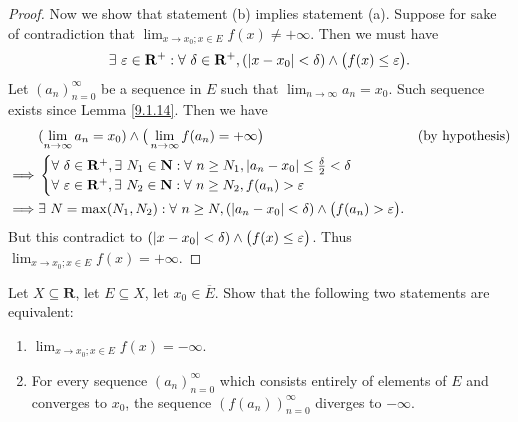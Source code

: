 \begin{proof}
    Now we show that statement (b) implies statement (a).
    Suppose for sake of contradiction that \(\lim_{x \to x_0 ; x \in E} f(x) \neq +\infty\).
    Then we must have
    \[
        \exists\ \varepsilon \in \mathbf{R}^+ : \forall\ \delta \in \mathbf{R}^+, (\abs*{x - x_0} < \delta) \land \big(f(x) \leq \varepsilon\big).
    \]
    Let \((a_n)_{n = 0}^\infty\) be a sequence in \(E\) such that \(\lim_{n \to \infty} a_n = x_0\).
    Such sequence exists since Lemma \ref{9.1.14}.
    Then we have
    \begin{align*}
                 & (\lim_{n \to \infty} a_n = x_0) \land \big(\lim_{n \to \infty} f(a_n) = +\infty\big)                               & \text{(by hypothesis)} \\
        \implies & \begin{cases}
            \forall\ \delta \in \mathbf{R}^+, \exists\ N_1 \in \mathbf{N} : \forall\ n \geq N_1, \abs*{a_n - x_0} \leq \frac{\delta}{2} < \delta \\
            \forall\ \varepsilon \in \mathbf{R}^+, \exists\ N_2 \in \mathbf{N} : \forall\ n \geq N_2, f(a_n) > \varepsilon
        \end{cases}                                                                                                                  \\
        \implies & \exists\ N = \max(N_1, N_2) : \forall\ n \geq N, (\abs*{a_n - x_0} < \delta) \land \big(f(a_n) > \varepsilon\big).
    \end{align*}
    But this contradict to \((\abs*{x - x_0} < \delta) \land \big(f(x) \leq \varepsilon\big)\).
    Thus \(\lim_{x \to x_0 ; x \in E} f(x) = +\infty\).
\end{proof}

\begin{additional corollary}\label{ac 9.5.4}
Let \(X \subseteq \mathbf{R}\), let \(E \subseteq X\), let \(x_0 \in \overline{E}\).
Show that the following two statements are equivalent:
\begin{enumerate}
    \item \(\lim_{x \to x_0 ; x \in E} f(x) = -\infty\).
    \item For every sequence \((a_n)_{n = 0}^\infty\) which consists entirely of elements of \(E\) and converges to \(x_0\), the sequence \((f(a_n))_{n = 0}^\infty\) diverges to \(-\infty\).
\end{enumerate}
\end{additional corollary}

